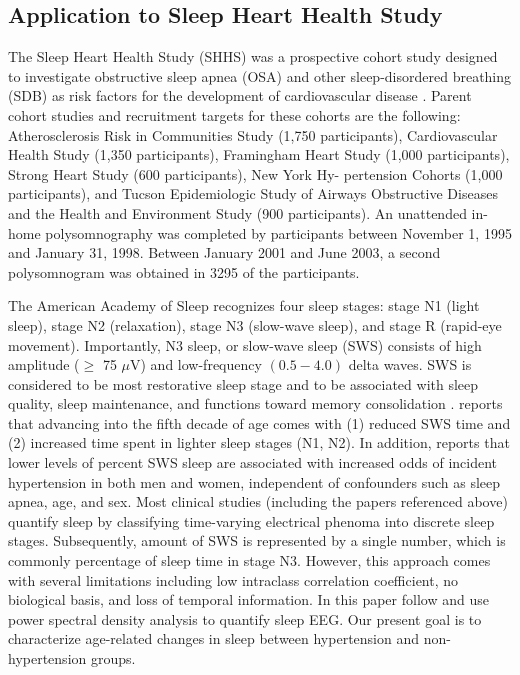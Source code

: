 \documentclass[useAMS,referee,usenatbib]{biom}
\begin{document}
\subsection{Application to Sleep Heart Health Study}
The Sleep Heart Health Study (SHHS) was a prospective cohort study designed to investigate obstructive sleep apnea (OSA) and other sleep-disordered breathing (SDB) as risk factors for the development of cardiovascular disease \citep{Quan1997}. Parent cohort studies and recruitment targets for these cohorts are the following: Atherosclerosis Risk in Communities Study (1,750 participants), Cardiovascular Health Study (1,350 participants), Framingham Heart Study (1,000 participants), Strong Heart Study (600 participants), New York Hy- pertension Cohorts (1,000 participants), and Tucson Epidemiologic Study of Airways Obstructive Diseases and the Health and Environment Study (900 participants). An unattended in-home polysomnography was completed by participants between November 1, 1995 and January 31, 1998. Between January 2001 and June 2003, a second polysomnogram was obtained in 3295 of the participants. %

The American Academy of Sleep recognizes four sleep stages: stage N1 (light sleep), stage N2 (relaxation), stage N3 (slow-wave sleep), and stage R (rapid-eye movement). Importantly, N3 sleep, or slow-wave sleep (SWS) consists of high amplitude ($\geq$ 75 $\mu$V) and low-frequency  $(0.5-4.0)$ delta waves. SWS is considered to be most restorative sleep stage and to be associated with sleep quality, sleep maintenance, and functions toward memory consolidation \citep{Bonnet1987, Akerstedt1997, Walker2009}. \citet{Mander2017} reports that advancing into the fifth decade of age comes with (1) reduced SWS time and (2) increased time spent in lighter sleep stages (N1, N2). In addition, \citet{Javaheri2018} reports that lower levels of percent SWS sleep are associated with increased odds of incident hypertension in both men and women, independent of confounders such as sleep apnea, age, and sex. Most clinical studies (including the papers referenced above) quantify sleep by classifying time-varying electrical phenoma into discrete sleep stages. Subsequently, amount of SWS is represented by a single number, which is commonly percentage of sleep time in stage N3. However, this approach comes with several limitations \citep{Crainiceanu2009} including low intraclass correlation coefficient, no biological basis, and loss of temporal information. In this paper follow \citet{Crainiceanu2009, Di2009} and use power spectral density analysis to quantify sleep EEG. Our present goal is to characterize age-related changes in sleep between hypertension and non-hypertension groups. 
\end{document}
